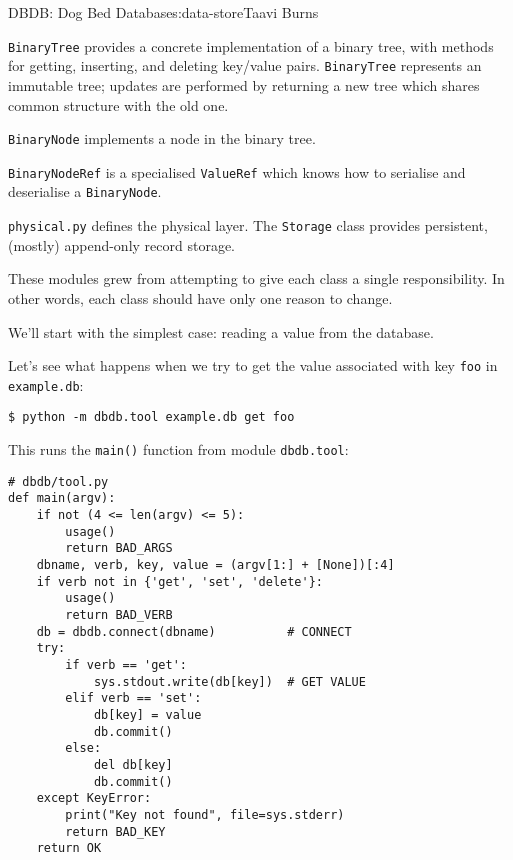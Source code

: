 \begin{aosachapter}{DBDB: Dog Bed Database}{s:data-store}{Taavi Burns}
\begin{aosaitemize}
  \begin{aosaitemize}
  \item
    \texttt{BinaryTree} provides a concrete implementation of a binary
    tree, with methods for getting, inserting, and deleting key/value
    pairs. \texttt{BinaryTree} represents an immutable tree; updates are
    performed by returning a new tree which shares common structure with
    the old one.
  \item
    \texttt{BinaryNode} implements a node in the binary tree.
  \item
    \texttt{BinaryNodeRef} is a specialised \texttt{ValueRef} which
    knows how to serialise and deserialise a \texttt{BinaryNode}.
  \end{aosaitemize}
\item
  \texttt{physical.py} defines the physical layer. The \texttt{Storage}
  class provides persistent, (mostly) append-only record storage.
\end{aosaitemize}

These modules grew from attempting to give each class a single
responsibility. In other words, each class should have only one reason
to change.

\label{reading-a-value}

We'll start with the simplest case: reading a value from the database.

Let's see what happens when we try to get the value associated with key
\texttt{foo} in \texttt{example.db}:

\begin{verbatim}
$ python -m dbdb.tool example.db get foo
\end{verbatim}

This runs the \texttt{main()} function from module \texttt{dbdb.tool}:

\begin{verbatim}
# dbdb/tool.py
def main(argv):
    if not (4 <= len(argv) <= 5):
        usage()
        return BAD_ARGS
    dbname, verb, key, value = (argv[1:] + [None])[:4]
    if verb not in {'get', 'set', 'delete'}:
        usage()
        return BAD_VERB
    db = dbdb.connect(dbname)          # CONNECT
    try:
        if verb == 'get':
            sys.stdout.write(db[key])  # GET VALUE
        elif verb == 'set':
            db[key] = value
            db.commit()
        else:
            del db[key]
            db.commit()
    except KeyError:
        print("Key not found", file=sys.stderr)
        return BAD_KEY
    return OK
\end{verbatim}


\end{aosachapter}
